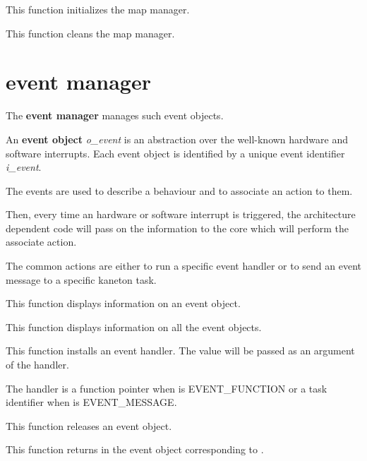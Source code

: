 	 {
	   This function initializes the map manager.
	 }

	 {
	   This function cleans the map manager.
	 }

%
%

\section{event manager}

The \textbf{event manager} manages such event objects.

An \textbf{event object} \textit{o\_event} is an abstraction over the
well-known hardware and software interrupts. Each event object is
identified by a unique event identifier \textit{i\_event}.

The events are used to describe a behaviour and to associate an action
to them.

Then, every time an hardware or software interrupt is triggered, the
architecture dependent code will pass on the information to the core
which will perform the associate action.

The common actions are either to run a specific event handler or to
send an event message to a specific kaneton task.

%
%

	 {
	   This function displays information on an event object.
	 }

	 {
	   This function displays information on all the event objects.
	 }

	 {
	   This function installs an event handler. The 
	   value will be passed as an argument of the handler.

	   The handler  is a function pointer when
	    is EVENT\_FUNCTION or a task identifier when
	    is EVENT\_MESSAGE.
	 }

	 {
	   This function releases an event object.
	 }

	 {
	   This function returns in  the event object
	   corresponding to .
	 }

